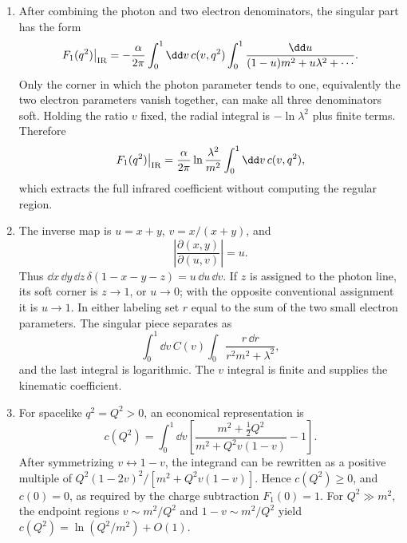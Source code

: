 \begin{enumerate}
\begin{enumerate}
\item
After combining the photon and two electron denominators, the singular
part has the form
\[
 F_1(q^2)\big|_{\rm IR}
 =-\frac{\alpha}{2\pi}\int_0^1\dd v\,c(v,q^2)
 \int_0^1\frac{\dd u}{(1-u)m^2+u\lambda^2+\cdots}.
\]
Only the corner in which the photon parameter tends to one, equivalently
the two electron parameters vanish together, can make all three
denominators soft.  Holding the ratio \(v\) fixed, the radial integral is
\(-\ln\lambda^2\) plus finite terms.  Therefore
\[
 F_1(q^2)\big|_{\rm IR}
 =\frac{\alpha}{2\pi}\ln\frac{\lambda^2}{m^2}
 \int_0^1\dd v\,c(v,q^2),
\]
which extracts the full infrared coefficient without computing the
regular region.
\item
The inverse map is \(u=x+y\), \(v=x/(x+y)\), and
\[
 \left|\frac{\partial(x,y)}{\partial(u,v)}\right|=u.
\]
Thus \(\dd x\,\dd y\,\dd z\,\delta(1-x-y-z)=u\,\dd u\,\dd v\).  If \(z\) is assigned to
the photon line, its soft corner is \(z\to1\), or \(u\to0\); with the
opposite conventional assignment it is \(u\to1\).  In either labeling set
\(r\) equal to the sum of the two small electron parameters.  The singular
piece separates as
\[
 \int_0^1\dd v\,C(v)\int_0\frac{r\,\dd r}{r^2m^2+\lambda^2},
\]
and the last integral is logarithmic.  The \(v\) integral is finite and
supplies the kinematic coefficient.
\item
For spacelike \(q^2=Q^2>0\), an economical representation is
\[
 c(Q^2)=\int_0^1\dd v\left[
 \frac{m^2+\tfrac12Q^2}{m^2+Q^2v(1-v)}-1\right].
\]
After symmetrizing \(v\leftrightarrow1-v\), the integrand can be rewritten
as a positive multiple of \(Q^2(1-2v)^2/
[m^2+Q^2v(1-v)]\).  Hence \(c(Q^2)\ge0\), and \(c(0)=0\), as required by
the charge subtraction \(F_1(0)=1\).  For \(Q^2\gg m^2\), the endpoint
regions \(v\sim m^2/Q^2\) and \(1-v\sim m^2/Q^2\) yield
\(c(Q^2)=\ln(Q^2/m^2)+O(1)\).
\end{enumerate}


\end{enumerate}
